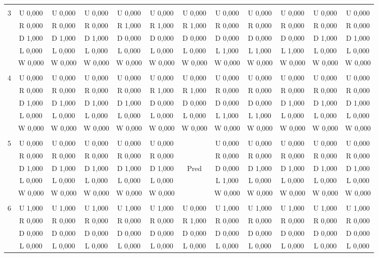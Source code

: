 \begin{table}[htbp]
\begin{tiny}
\begin{tabular}{c|c|c|c|c|c|c|c|c|c|c|c|}
\hline \\
3&U 0,000&U 0,000&U 0,000&U 0,000&U 0,000&U 0,000&U 0,000&U 0,000&U 0,000&U 0,000&U 0,000\\
&R 0,000&R 0,000&R 0,000&R 1,000&R 1,000&R 1,000&R 0,000&R 0,000&R 0,000&R 0,000&R 0,000\\
&D 1,000&D 1,000&D 1,000&D 0,000&D 0,000&D 0,000&D 0,000&D 0,000&D 0,000&D 1,000&D 1,000\\
&L 0,000&L 0,000&L 0,000&L 0,000&L 0,000&L 0,000&L 1,000&L 1,000&L 1,000&L 0,000&L 0,000\\
&W 0,000&W 0,000&W 0,000&W 0,000&W 0,000&W 0,000&W 0,000&W 0,000&W 0,000&W 0,000&W 0,000\\
\hline \\
4&U 0,000&U 0,000&U 0,000&U 0,000&U 0,000&U 0,000&U 0,000&U 0,000&U 0,000&U 0,000&U 0,000\\
&R 0,000&R 0,000&R 0,000&R 0,000&R 1,000&R 1,000&R 0,000&R 0,000&R 0,000&R 0,000&R 0,000\\
&D 1,000&D 1,000&D 1,000&D 1,000&D 0,000&D 0,000&D 0,000&D 0,000&D 1,000&D 1,000&D 1,000\\
&L 0,000&L 0,000&L 0,000&L 0,000&L 0,000&L 0,000&L 1,000&L 1,000&L 0,000&L 0,000&L 0,000\\
&W 0,000&W 0,000&W 0,000&W 0,000&W 0,000&W 0,000&W 0,000&W 0,000&W 0,000&W 0,000&W 0,000\\
\hline \\
5&U 0,000&U 0,000&U 0,000&U 0,000&U 0,000&&U 0,000&U 0,000&U 0,000&U 0,000&U 0,000\\
&R 0,000&R 0,000&R 0,000&R 0,000&R 0,000&&R 0,000&R 0,000&R 0,000&R 0,000&R 0,000\\
&D 1,000&D 1,000&D 1,000&D 1,000&D 1,000&Pred&D 0,000&D 1,000&D 1,000&D 1,000&D 1,000\\
&L 0,000&L 0,000&L 0,000&L 0,000&L 0,000&&L 1,000&L 0,000&L 0,000&L 0,000&L 0,000\\
&W 0,000&W 0,000&W 0,000&W 0,000&W 0,000&&W 0,000&W 0,000&W 0,000&W 0,000&W 0,000\\
\hline \\
6&U 1,000&U 1,000&U 1,000&U 1,000&U 1,000&U 0,000&U 1,000&U 1,000&U 1,000&U 1,000&U 1,000\\
&R 0,000&R 0,000&R 0,000&R 0,000&R 0,000&R 1,000&R 0,000&R 0,000&R 0,000&R 0,000&R 0,000\\
&D 0,000&D 0,000&D 0,000&D 0,000&D 0,000&D 0,000&D 0,000&D 0,000&D 0,000&D 0,000&D 0,000\\
&L 0,000&L 0,000&L 0,000&L 0,000&L 0,000&L 0,000&L 0,000&L 0,000&L 0,000&L 0,000&L 0,000\\

\end{tabular}
\end{tiny}
\end{table}
